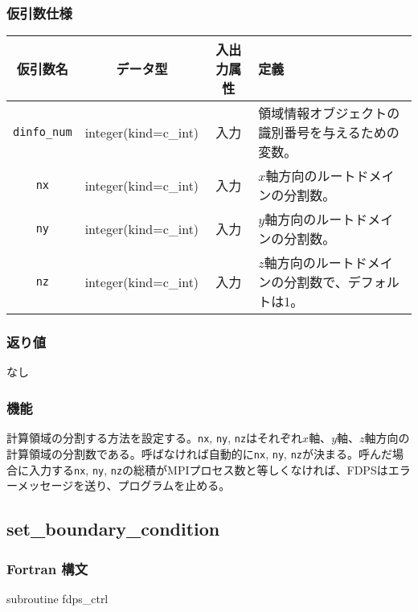 \subsubsection*{仮引数仕様}
\begin{table}[h]
\begin{tabularx}{\linewidth}{cccX}
\toprule
\rowcolor{Snow2}
仮引数名 & データ型 & 入出力属性 & 定義 \\
\midrule
\texttt{dinfo\_num} & integer(kind=c\_int) & 入力 & 領域情報オブジェクトの識別番号を与えるための変数。\\
\texttt{nx} & integer(kind=c\_int) & 入力 & $x$軸方向のルートドメインの分割数。\\
\texttt{ny} & integer(kind=c\_int) & 入力 & $y$軸方向のルートドメインの分割数。\\
\texttt{nz} & integer(kind=c\_int) & 入力 & $z$軸方向のルートドメインの分割数で、デフォルトは1。\\
\bottomrule
\end{tabularx}
\end{table}

\subsubsection*{返り値}
なし

\subsubsection*{機能}
計算領域の分割する方法を設定する。\texttt{nx}, \texttt{ny}, \texttt{nz}はそれぞれ$x$軸、$y$軸、$z$軸方向の計算領域の分割数である。呼ばなければ自動的に\texttt{nx}, \texttt{ny}, \texttt{nz}が決まる。呼んだ場合に入力する\texttt{nx}, \texttt{ny}, \texttt{nz}の総積がMPIプロセス数と等しくなければ、FDPSはエラーメッセージを送り、プログラムを止める。

\clearpage

\subsection{set\_boundary\_condition}
\subsubsection*{Fortran 構文}
\begin{screen}
\begin{spverbatim}
subroutine fdps_ctrl%
\end{spverbatim}
\end{screen}

